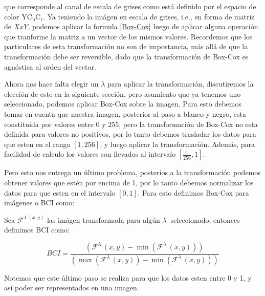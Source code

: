     que corresponde al canal de escala de grises como est\'a definido por el espacio de color $\mathrm{YC}_{\mathrm{b}} \mathrm{C}_{\mathrm{r}}$. Ya teniendo la im\'agen en escala de grises, i.e., en forma de matriz de $XxY$, podemos aplicar la formula \ref{Box-Cox} luego de aplicar alguna operaci\'on que tranforme la matriz a un vector de los mismos valores. Recordemos que los particulares de esta transformaci\'on no son de importancia, m\'as all\'a de que la transformaci\'on debe ser reversible, dado que la transformaci\'on de Box-Cox es agn\'ostica al orden del vector.

    Ahora nos hace falta elegir un $\lambda$ para aplicar la transformaci\'on, discutiremos la elecci\'on de este en la siguiente secci\'on, pero asumiento que ya tenemos uno seleccionado, podemos aplicar Box-Cox sobre la imagen. Para esto debemos tomar en cuenta que nuestra imagen, posterior al paso a blanco y negro, esta constituida por valores entre $0$ y $255$, pero la transformaci\'on de Box-Cox no esta definida para valores no positivos, por lo tanto debemos trasladar los datos para que esten en el rango $[1,256]$, y luego aplicar la transformaci\'on. Adem\'as, para facilidad de calculo los valores son llevados al intervalo $[\frac{1}{256},1]$.

    Pero esto nos entrega un \'ultimo problema, posterios a la transformaci\'on podemos obtener valores que est\'en por encima de 1, por lo tanto debemos normalizar los datos para que esten en el intervalo $[0,1]$. Para esto definimos Box-Cox para im\'agenes o BCI como:

    \begin{defn}

        Sea $\mathcal{F}^{\lambda_{\cdot}(x, y)}$ las im\'agen transformada para alg\'un $\lambda_\cdot$ seleccionado, entonces definimos BCI como:

    \begin{equation}
        BCI = \frac{\left(\mathcal{F}^{\lambda_{\cdot}}(x, y) - \min\left(\mathcal{F}^{\lambda_{\cdot}}(x, y)\right)\right)}{\left(\max\left(\mathcal{F}^{\lambda_{\cdot}}(x, y)\right) - \min\left(\mathcal{F}^{\lambda_{\cdot}}(x, y)\right)\right)}
    \end{equation}
        
        
    \end{defn}

    Notemos que este \'ultimo paso se realiza para que los datos esten entre 0 y 1, y as\'i poder ser representados en una imagen.
    
